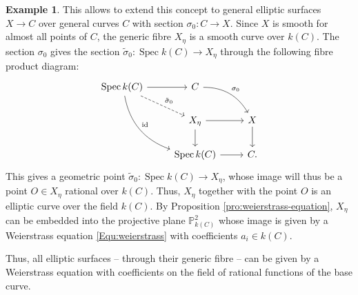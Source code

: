 \documentclass{report}
\DeclareMathOperator{\Spec}{Spec}
\DeclareMathOperator{\id}{id}
\theoremstyle{definition}
\newtheorem{example}[equation]{Example}
\begin{document}
\begin{example}
This allows to extend this concept to general elliptic surfaces $X\rightarrow C$ over general curves $C$ with section $\sigma_0:C\rightarrow X$. Since $X$ is smooth for almost all points of $C$, the generic fibre $X_{\eta}$ is a smooth curve over $k(C)$. The section $\sigma_0$ gives the section $\tilde{\sigma}_0:\Spec k(C)\rightarrow X_{\eta}$ through the following fibre product diagram:
\[
\begin{tikzcd}
\Spec k(C)\arrow[r]\arrow[rd,dashed,"\tilde{\sigma}_0"]\arrow[rdd,bend right,"\id"]&C\arrow[rd,bend left,"\sigma_0"]\\
&X_{\eta}\arrow[r]\arrow[d]&X\arrow[d]\\
&\Spec k(C)\arrow[r]&C.
\end{tikzcd}
\]
This gives a geometric point $\tilde{\sigma}_0:\Spec k(C)\rightarrow X_{\eta}$, whose image will thus be a point $O\in X_{\eta}$ rational over $k(C)$. Thus, $X_{\eta}$ together with the point $O$ is an elliptic curve over the field $k(C)$. By Proposition \ref{pro:weierstrass-equation}, $X_{\eta}$ can be embedded into the projective plane $\mathbb{P}_{k(C)}^2$ whose image is given by a Weierstrass equation \eqref{Equ:weierstrass} with coefficients $a_i\in k(C)$.

Thus, all elliptic surfaces -- through their generic fibre -- can be given by a Weierstrass equation with coefficients on the field of rational functions of the base curve.
\end{example}
\end{document}
